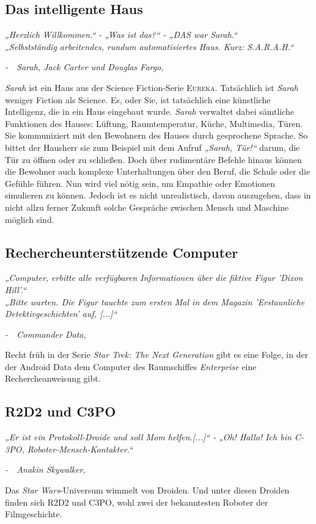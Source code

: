 \documentclass[12pt,twoside]{article}
\theoremstyle{plain}
\theoremstyle{definition}
\theoremstyle{remark}
\begin{document}
\subsection{Das intelligente Haus}
\label{ssec:sarah}
\textit{„Herzlich Willkommen.“ - „Was ist das?“ - „DAS war Sarah.“\\
        „Selbstständig arbeitendes, rundum automatisiertes Haus. Kurz: S.A.R.A.H.“}
\begin{flushright}
    \textit{-~~Sarah, Jack Carter und Douglas Fargo, \cite{EUR102}}
\end{flushright}
\textit{Sarah} ist ein Haus aus der Science Fiction-Serie \textsc{Eureka}.
Tatsächlich ist \textit{Sarah} weniger Fiction als Science.
Es, oder Sie, ist tatsächlich eine künstliche Intelligenz, die in ein Haus eingebaut wurde.
\textit{Sarah} verwaltet dabei sämtliche Funktionen des Hauses: Lüftung, Raumtemperatur, Küche, Multimedia, Türen.
Sie kommuniziert mit den Bewohnern des Hauses durch gesprochene Sprache.
So bittet der Hausherr sie zum Beispiel mit dem Aufruf \textit{„Sarah, Tür!“} darum, die Tür zu öffnen oder zu schließen.
Doch über rudimentäre Befehle hinaus können die Bewohner auch komplexe Unterhaltungen über den Beruf, die Schule oder die Gefühle führen.
Nun wird viel nötig sein, um Empathie oder Emotionen simulieren zu können.
Jedoch ist es nicht unrealistisch, davon auszugehen, dass in nicht allzu ferner Zukunft solche Gespräche zwischen Mensch und Maschine möglich sind.
\subsection{Rechercheunterstützende Computer}
\label{ssec:data}
\textit{„Computer, erbitte alle verfügbaren Informationen über die fiktive Figur 'Dixon Hill'.“\\
        „Bitte warten. Die Figur tauchte zum ersten Mal in dem Magazin 'Erstaunliche Detektivgeschichten' auf, [...]“}
\begin{flushright}
    \textit{-~~Commander Data, \cite{TNG112}}
\end{flushright}
Recht früh in der Serie \textit{Star Trek: The Next Generation} gibt es eine Folge, in der der Android Data dem Computer des Raumschiffes \textit{Enterprise} eine Rechercheanweisung gibt.

\subsection{R2D2 und C3PO}
\label{ssec:r2d2}
\textit{„Er ist ein Protokoll-Droide und soll Mom helfen.[...]“ - „Oh! Hallo! Ich bin C-3PO, Roboter-Mensch-Kontakter.“}
\begin{flushright}
    \textit{-~~Anakin Skywalker, \cite{SWEP1}}
\end{flushright}
Das \textit{Star Wars}-Universum wimmelt von Droiden.
Und unter diesen Droiden finden sich R2D2 und C3PO, wohl zwei der bekanntesten Roboter der Filmgeschichte.
\end{document}
